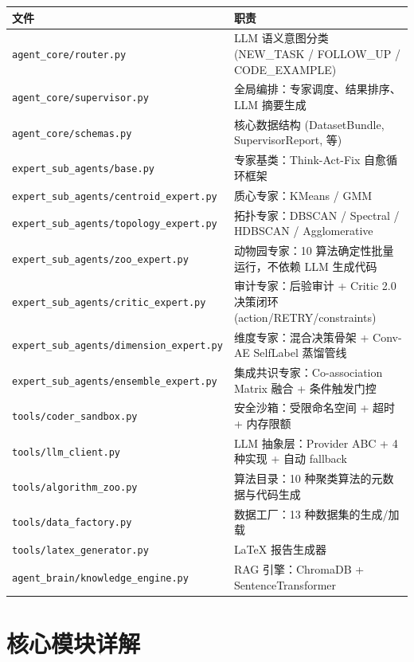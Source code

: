 \documentclass[12pt,a4paper]{article}
\begin{document}
\begin{table}[H]
\centering
\begin{tabular}{@{}lp{7cm}@{}}
\toprule
\textbf{文件} & \textbf{职责} \\
\midrule
\texttt{agent\_core/router.py} & LLM 语义意图分类 (NEW\_TASK / FOLLOW\_UP / CODE\_EXAMPLE) \\
\texttt{agent\_core/supervisor.py} & 全局编排：专家调度、结果排序、LLM 摘要生成 \\
\texttt{agent\_core/schemas.py} & 核心数据结构 (DatasetBundle, SupervisorReport, 等) \\
\texttt{expert\_sub\_agents/base.py} & 专家基类：Think-Act-Fix 自愈循环框架 \\
\texttt{expert\_sub\_agents/centroid\_expert.py} & 质心专家：KMeans / GMM \\
\texttt{expert\_sub\_agents/topology\_expert.py} & 拓扑专家：DBSCAN / Spectral / HDBSCAN / Agglomerative \\
\texttt{expert\_sub\_agents/zoo\_expert.py} & 动物园专家：10 算法确定性批量运行，不依赖 LLM 生成代码 \\
\texttt{expert\_sub\_agents/critic\_expert.py} & 审计专家：后验审计 + Critic 2.0 决策闭环 (action/RETRY/constraints) \\
\texttt{expert\_sub\_agents/dimension\_expert.py} & 维度专家：混合决策骨架 + Conv-AE SelfLabel 蒸馏管线 \\
\texttt{expert\_sub\_agents/ensemble\_expert.py} & 集成共识专家：Co-association Matrix 融合 + 条件触发门控 \\
\texttt{tools/coder\_sandbox.py} & 安全沙箱：受限命名空间 + 超时 + 内存限额 \\
\texttt{tools/llm\_client.py} & LLM 抽象层：Provider ABC + 4 种实现 + 自动 fallback \\
\texttt{tools/algorithm\_zoo.py} & 算法目录：10 种聚类算法的元数据与代码生成 \\
\texttt{tools/data\_factory.py} & 数据工厂：13 种数据集的生成/加载 \\
\texttt{tools/latex\_generator.py} & LaTeX 报告生成器 \\
\texttt{agent\_brain/knowledge\_engine.py} & RAG 引擎：ChromaDB + SentenceTransformer \\
\bottomrule
\end{tabular}
\end{table}

\newpage

\section{核心模块详解}
\end{document}
